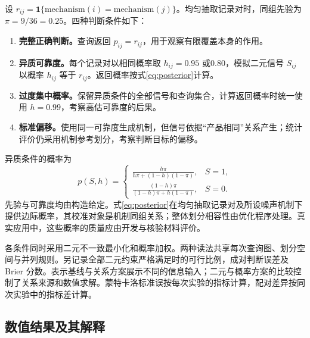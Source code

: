 \documentclass[UTF8,a4paper,zihao=-4,fontset=fandol]{ctexart}
\newcommand{\ind}{\mathbf 1}
\begin{document}
设 $r_{ij}=\ind\{\mathrm{mechanism}(i)=\mathrm{mechanism}(j)\}$。均匀抽取记录对时，同组先验为 $\pi=9/36=0.25$。四种判断条件如下：

\begin{enumerate}
\item \textbf{完整正确判断。}查询返回 $p_{ij}=r_{ij}$，用于观察有限覆盖本身的作用。
\item \textbf{异质可靠度。}每个记录对以相同概率取 $h_{ij}=0.95$ 或0.80，模拟二元信号 $S_{ij}$ 以概率 $h_{ij}$ 等于 $r_{ij}$。返回概率按式\eqref{eq:posterior}计算。
\item \textbf{过度集中概率。}保留异质条件的全部信号和查询集合，计算返回概率时统一使用 $h=0.99$，考察高估可靠度的后果。
\item \textbf{标准偏移。}使用同一可靠度生成机制，但信号依据“产品相同”关系产生；统计评价仍采用机制参考划分，考察判断目标的偏移。
\end{enumerate}

异质条件的概率为
\begin{equation}
 p(S,h)=
 \begin{cases}
 \displaystyle\frac{h\pi}{h\pi+(1-h)(1-\pi)},&S=1,\\[0.7em]
 \displaystyle\frac{(1-h)\pi}{(1-h)\pi+h(1-\pi)},&S=0.
 \end{cases}
 \label{eq:posterior}
\end{equation}
先验与可靠度均由构造给定。式\eqref{eq:posterior}在均匀抽取记录对及所设噪声机制下提供边际概率，其校准对象是机制同组关系；整体划分相容性由优化程序处理。真实应用中，这些概率的质量应由开发与核验材料评价。

各条件同时采用二元不一致最小化和概率加权。两种读法共享每次查询图、划分空间与并列规则。另记录全部二元约束严格满足时的可行比例，成对判断误差及 Brier 分数。表示基线与关系方案展示不同的信息输入；二元与概率方案的比较控制了关系来源和数值求解。蒙特卡洛标准误按每次实验的指标计算，配对差异按同次实验中的指标差计算。

\subsection{数值结果及其解释}
\end{document}
